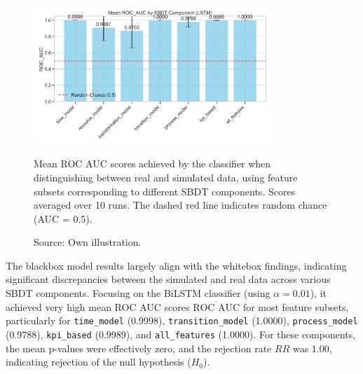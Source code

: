 \begin{figure}[htbp]
  \centering
  \includegraphics[width=0.8\textwidth]{figures/lstm-roc-auc-by-component.png}
  \caption[Results Blackbox model]{Mean ROC AUC scores achieved by the classifier when distinguishing between real and simulated data, using feature subsets corresponding to different SBDT components. Scores averaged over 10 runs. The dashed red line indicates random chance (AUC = 0.5).}
  \label{fig:bilstm-roc-auc}
  \caption*{Source: Own illustration.}
\end{figure}

The blackbox model results largely align with the whitebox findings, indicating significant discrepancies between the simulated and real data across various SBDT components. Focusing on the BiLSTM classifier (using $\alpha = 0.01$), it achieved very high mean ROC AUC scores $\overline{\text{ROC AUC}}$ for most feature subsets, particularly for \texttt{time\_model} (0.9998), \texttt{transition\_model} (1.0000), \texttt{process\_model} (0.9788), \texttt{kpi\_based} (0.9989), and \texttt{all\_features} (1.0000). For these components, the mean p-values were effectively zero, and the rejection rate $RR$ was 1.00, indicating rejection of the null hypothesis ($H_0$).

